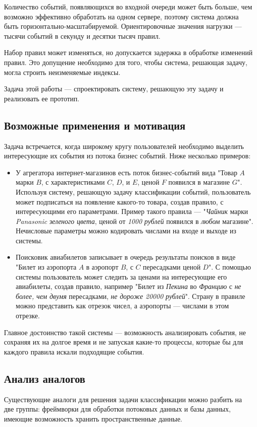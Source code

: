 \documentclass[14pt]{article}
\begin{document}
Количество событий, появляющихся во входной очереди может быть больше, чем возможно эффективно обработать на одном сервере, поэтому система должна быть горизонтально-масштабируемой. Ориентировочные значения нагрузки --- тысячи событий в секунду и десятки тысяч правил.

Набор правил может изменяться, но допускается задержка в обработке изменений правил. Это допущение необходимо для того, чтобы система, решающая задачу, могла строить неизменяемые индексы.

Задача этой работы --- спроектировать систему, решающую эту задачу и реализовать ее прототип.

\subsection{Возможные применения и мотивация}
Задача встречается, когда широкому кругу пользователей необходимо выделить интересующие их события из потока бизнес событий. Ниже несколько примеров:
\begin{itemize}
    \item У агрегатора интернет-магазинов есть поток бизнес-событий вида "Товар $A$ марки $B$, с характеристиками $C$, $D$, и $E$, ценой $F$ появился в магазине $G$". Используя систему, решающую задачу классификации событий, пользователь может подписаться на появление какого-то товара, создав правило, с интересующими его параметрами. Пример такого правила --- "\emph{Чайник} марки \emph{Panasonic} \emph{зеленого цвета}, ценой от \emph{1000 рублей} появился в \emph{любом} магазине". Нечисловые параметры можно кодировать числами на входе и выходе из системы.
    \item Поисковик авиабилетов записывает в очередь результаты поисков в виде "Билет из аэропорта $A$ в аэропорт $B$, с $C$ пересадками ценой $D$". С помощью системы пользователь может следить за ценами на интересующие его авиабилеты, создав правило, например "Билет из \emph{Пекина} во \emph{Францию} с \emph{не более, чем двумя} пересадками, \emph{не дороже 20000 рублей}". Страну в правиле можно представить как отрезок чисел, а аэропорты --- числами в этом отрезке.
\end{itemize}

Главное достоинство такой системы --- возможность анализировать события, не сохраняя их на долгое время и не запуская какие-то процессы, которые бы для каждого правила искали подходящие события.

\subsection{Анализ аналогов}
Существующие аналоги для решения задачи классификации можно разбить на две группы: фреймворки для обработки потоковых данных и базы данных, имеющие возможность хранить пространственные данные.
\end{document}
